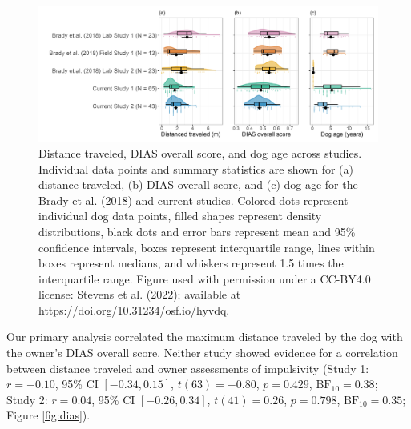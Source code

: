 \documentclass[
  pub,floatsintext]{apa6}
\begin{document}
\begin{figure}

{\centering \includegraphics[width=1\linewidth]{figures/study_comparison} 

}

\caption{Distance traveled, DIAS overall score, and dog age across studies. Individual data points and summary statistics are shown for (a) distance traveled, (b) DIAS overall score, and (c) dog age for the Brady et al. (2018) and current studies. Colored dots represent individual dog data points, filled shapes represent density distributions, black dots and error bars represent mean and 95\% confidence intervals, boxes represent interquartile range, lines within boxes represent medians, and whiskers represent 1.5 times the interquartile range. Figure used with permission under a CC-BY4.0 license: Stevens et al. (2022); available at https://doi.org/10.31234/osf.io/hyvdq.}\label{fig:study-comp}
\end{figure}

Our primary analysis correlated the maximum distance traveled by the dog with the owner's DIAS overall score. Neither study showed evidence for a correlation between distance traveled and owner assessments of impulsivity (Study 1: \(r = -0.10\), 95\% CI \([-0.34, 0.15]\), \(t(63) = -0.80\), \(p = 0.429\), \(\mathrm{BF}_{\textrm{10}} = 0.38\); Study 2: \(r = 0.04\), 95\% CI \([-0.26, 0.34]\), \(t(41) = 0.26\), \(p = 0.798\), \(\mathrm{BF}_{\textrm{10}} = 0.35\); Figure \ref{fig:dias}).
\end{document}
